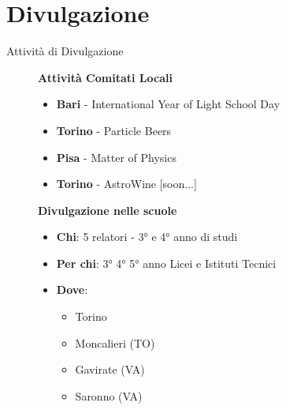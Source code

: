 \documentclass{Bredelebeamer}
\begin{document}
\section{Divulgazione}
\begin{frame}
\begin{block}{}
\end{block}
\end{frame} 
\begin{frame}{Attività di Divulgazione}
\begin{figure}
\begin{block}{\centering \textbf{Attività Comitati Locali}}
\begin{itemize}
\item \textbf{{Bari}} - International Year of Light School Day
\item \textbf{{Torino}} - Particle Beers
\item \textbf{{Pisa}} - Matter of Physics
\item \textbf{{Torino}} - AstroWine [soon...]
\end{itemize}
\end{block}
\begin{block}{\centering \textbf{Divulgazione nelle scuole}}
\begin{itemize}
\item \textbf{Chi}: 5 relatori - 3° e 4° anno di studi
\item \textbf{Per chi}: 3° 4° 5° anno Licei e Istituti Tecnici
\item \textbf{Dove}:
	\begin{itemize}
	\item Torino
	\item Moncalieri (TO)
	\item Gavirate (VA)
	\item Saronno (VA)
	\end{itemize}
\end{itemize}
\end{block}
\end{figure}
\end{frame}
\end{document}
